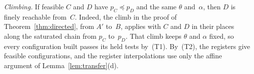 \emph{Climbing.} If feasible $C$ and $D$ have $p_C\preceq p_D$ and the
same $\theta$ and~$\alpha$, then $D$ is finely reachable from~$C$. Indeed,
the climb in the proof of Theorem~\ref{thm:directed}, from $A'$ to~$B$,
applies with $C$ and $D$ in their places along the saturated chain from
$p_C$ to~$p_D$. That climb keeps $\theta$ and $\alpha$ fixed, so every
configuration built passes its held tests by~(T1). By~(T2), the registers
give feasible configurations, and the register interpolations use only
the affine argument of Lemma~\ref{lem:transfer}(d).

